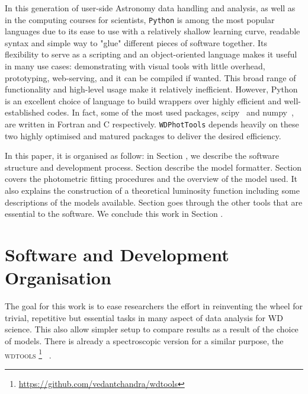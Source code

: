 \documentclass[fleqn,usenatbib]{rasti}
\begin{document}
In this generation of user-side Astronomy data handling and analysis, as well
as in the computing courses for scientists, \texttt{Python} is among the most
popular languages due to its ease to use with a relatively shallow learning
curve, readable syntax and simple way to "glue" different pieces of software
together. Its flexibility to serve as a scripting and an object-oriented
language makes it useful in many use cases: demonstrating with visual tools
with little overhead, prototyping, web-serving, and it can be compiled if
wanted. This broad range of functionality and high-level usage make it
relatively inefficient. However, Python is an excellent choice of language to
build wrappers over highly efficient and well-established codes. In fact,
some of the most used packages, scipy~\citep{2020NatMe..17..261V} and
numpy~\citep{2020Natur.585..357H}, are written in Fortran and C respectively.
\texttt{WDPhotTools} depends heavily on these two highly optimised and matured
packages to deliver the desired efficiency.

In this paper, it is organised as follow: in Section , we describe
the software structure and development process. Section  describe
the model formatter. Section  covers the photometric fitting
procedures and the overview of the model used. It also explains the
construction of a theoretical luminosity function including some descriptions
of the models available. Section  goes through the other tools
that are essential to the software. We conclude this work in Section
.

\section{Software and Development Organisation}
The goal for this work is to ease researchers the effort in reinventing the
wheel for trivial, repetitive but essential tasks in many aspect of data
analysis for WD science. This also allow simpler setup to compare results as a
result of the choice of models. There is already a spectroscopic version
for a similar purpose, the \textsc{wdtools}
\footnote{\url{https://github.com/vedantchandra/wdtools}}~
\citep{2020MNRAS.497.2688C}.
\end{document}
